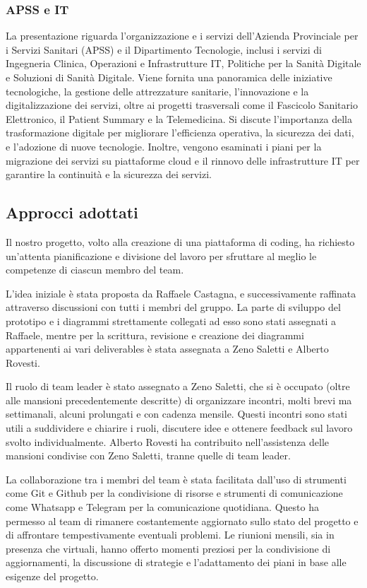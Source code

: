 \documentclass[11pt, a4paper]{article}
\theoremstyle{definition}
\begin{document}
\subsubsection{APSS e IT}
La presentazione riguarda l'organizzazione e i servizi dell'Azienda Provinciale
per i Servizi Sanitari (APSS) e il Dipartimento Tecnologie, inclusi i servizi di
Ingegneria Clinica, Operazioni e Infrastrutture IT, Politiche per la Sanità
Digitale e Soluzioni di Sanità Digitale. Viene fornita una panoramica delle
iniziative tecnologiche, la gestione delle attrezzature sanitarie, l'innovazione
e la digitalizzazione dei servizi, oltre ai progetti trasversali come il Fascicolo
Sanitario Elettronico, il Patient Summary e la Telemedicina. Si discute l'importanza
della trasformazione digitale per migliorare l'efficienza operativa, la sicurezza
dei dati, e l'adozione di nuove tecnologie. Inoltre, vengono esaminati i piani
per la migrazione dei servizi su piattaforme cloud e il rinnovo delle infrastrutture
IT per garantire la continuità e la sicurezza dei servizi.

\subsection{Approcci adottati}
Il nostro progetto, volto alla creazione di una piattaforma di coding, ha richiesto un'attenta pianificazione e divisione del lavoro per sfruttare al meglio le competenze di ciascun membro del team.

L’idea iniziale è stata proposta da Raffaele Castagna, e successivamente raffinata attraverso discussioni con tutti i membri del gruppo.
La parte di sviluppo del prototipo e i diagrammi strettamente collegati ad esso sono stati assegnati a Raffaele, mentre per la scrittura, revisione e creazione dei diagrammi appartenenti ai vari deliverables è stata assegnata a Zeno Saletti e Alberto Rovesti.

Il ruolo di team leader è stato assegnato a Zeno Saletti, che si è occupato (oltre alle mansioni precedentemente descritte) di organizzare incontri, molti brevi ma settimanali, alcuni prolungati e con cadenza mensile. Questi incontri sono stati utili a suddividere e chiarire i ruoli, discutere idee e ottenere feedback sul lavoro svolto individualmente.
Alberto Rovesti ha contribuito nell’assistenza delle mansioni condivise con Zeno Saletti, tranne quelle di team leader.


La collaborazione tra i membri del team è stata facilitata dall'uso di strumenti come Git e Github per la condivisione di risorse e strumenti di comunicazione come Whatsapp e Telegram per la comunicazione quotidiana. Questo ha permesso al team di rimanere costantemente aggiornato sullo stato del progetto e di affrontare tempestivamente eventuali problemi. Le riunioni mensili, sia in presenza che virtuali, hanno offerto momenti preziosi per la condivisione di aggiornamenti, la discussione di strategie e l'adattamento dei piani in base alle esigenze del progetto.
\end{document}
